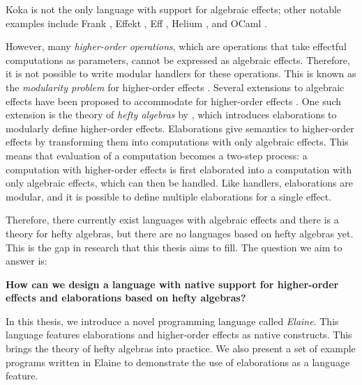 Koka is not the only language with support for algebraic effects; other notable examples include Frank \autocite{lindley_be_2017}, Effekt \autocite{brachthauser_effects_2020}, Eff \autocite{bauer_programming_2015}, Helium \autocite{biernacki_abstracting_2019}, and OCaml \autocite{sivaramakrishnan_retrofitting_2021}.

However, many \emph{higher-order operations}, which are operations that take effectful computations as parameters, cannot be expressed as algebraic effects. Therefore, it is not possible to write modular handlers for these operations. This is known as the \emph{modularity problem} for higher-order effects \autocite{wu_effect_2014}. Several extensions to algebraic effects have been proposed to accommodate for higher-order effects \autocite{wu_effect_2014,oh_latent_2021}. One such extension is the theory of \emph{hefty algebras} by \textcite{bach_poulsen_hefty_2023}, which introduces elaborations to modularly define higher-order effects. Elaborations give semantics to higher-order effects by transforming them into computations with only algebraic effects. This means that evaluation of a computation becomes a two-step process: a computation with higher-order effects is first elaborated into a computation with only algebraic effects, which can then be handled. Like handlers, elaborations are modular, and it is possible to define multiple elaborations for a single effect.

Therefore, there currently exist languages with algebraic effects and there is a theory for hefty algebras, but there are no languages based on hefty algebras yet. This is the gap in research that this thesis aims to fill. The question we aim to answer is:
\begin{center}
\textbf{How can we design a language with native support for higher-order effects and elaborations based on hefty algebras?}
\end{center}
In this thesis, we introduce a novel programming language called \emph{Elaine}. This language features elaborations and higher-order effects as native constructs. This brings the theory of hefty algebras into practice. We also present a set of example programs written in Elaine to demonstrate the use of elaborations as a language feature.

